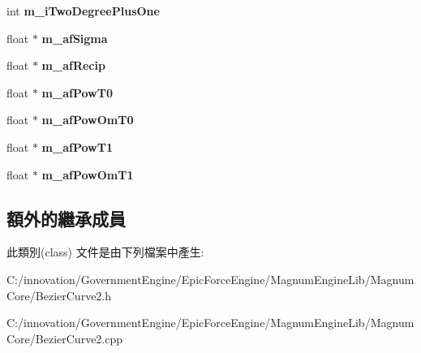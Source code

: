 \begin{DoxyCompactItemize}
\item 
int {\bfseries m\+\_\+i\+Two\+Degree\+Plus\+One}\hypertarget{class_i_dream_sky_1_1_bezier_curve2_acae3d947b798a305e32a2a493632d9aa}{}\label{class_i_dream_sky_1_1_bezier_curve2_acae3d947b798a305e32a2a493632d9aa}

\item 
float $\ast$ {\bfseries m\+\_\+af\+Sigma}\hypertarget{class_i_dream_sky_1_1_bezier_curve2_a2d746ae5dc6f160f4f865cf6e932b564}{}\label{class_i_dream_sky_1_1_bezier_curve2_a2d746ae5dc6f160f4f865cf6e932b564}

\item 
float $\ast$ {\bfseries m\+\_\+af\+Recip}\hypertarget{class_i_dream_sky_1_1_bezier_curve2_a76a052649e8188566cdb68d001da2dcc}{}\label{class_i_dream_sky_1_1_bezier_curve2_a76a052649e8188566cdb68d001da2dcc}

\item 
float $\ast$ {\bfseries m\+\_\+af\+Pow\+T0}\hypertarget{class_i_dream_sky_1_1_bezier_curve2_abbea01ad7bfd2d609b02cf36a8c5e2bc}{}\label{class_i_dream_sky_1_1_bezier_curve2_abbea01ad7bfd2d609b02cf36a8c5e2bc}

\item 
float $\ast$ {\bfseries m\+\_\+af\+Pow\+Om\+T0}\hypertarget{class_i_dream_sky_1_1_bezier_curve2_a152a4e0e5474ab92a37594dec0799bc7}{}\label{class_i_dream_sky_1_1_bezier_curve2_a152a4e0e5474ab92a37594dec0799bc7}

\item 
float $\ast$ {\bfseries m\+\_\+af\+Pow\+T1}\hypertarget{class_i_dream_sky_1_1_bezier_curve2_a05e5480fa57b0de35fb766b94be2a4a3}{}\label{class_i_dream_sky_1_1_bezier_curve2_a05e5480fa57b0de35fb766b94be2a4a3}

\item 
float $\ast$ {\bfseries m\+\_\+af\+Pow\+Om\+T1}\hypertarget{class_i_dream_sky_1_1_bezier_curve2_afd0fee44e6327e709221b7a1cf0ea349}{}\label{class_i_dream_sky_1_1_bezier_curve2_afd0fee44e6327e709221b7a1cf0ea349}

\end{DoxyCompactItemize}
\subsection*{額外的繼承成員}


此類別(class) 文件是由下列檔案中產生\+:\begin{DoxyCompactItemize}
\item 
C\+:/innovation/\+Government\+Engine/\+Epic\+Force\+Engine/\+Magnum\+Engine\+Lib/\+Magnum\+Core/Bezier\+Curve2.\+h\item 
C\+:/innovation/\+Government\+Engine/\+Epic\+Force\+Engine/\+Magnum\+Engine\+Lib/\+Magnum\+Core/Bezier\+Curve2.\+cpp\end{DoxyCompactItemize}
